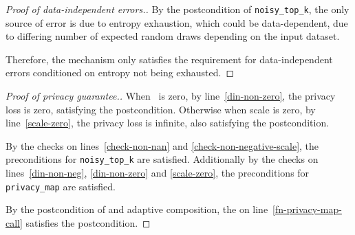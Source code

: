 \documentclass{article}
\begin{document}
\begin{theorem}
    \label{postcondition}
\end{theorem}

\begin{proof}[Proof of data-independent errors.]
    By the postcondition of \texttt{noisy\_top\_k},
    the only source of error is due to entropy exhaustion, which could be data-dependent, 
    due to differing number of expected random draws depending on the input dataset.

    Therefore, the mechanism only satisfies the requirement for data-independent errors conditioned on entropy not being exhausted.
\end{proof}

\begin{proof}[Proof of privacy guarantee.]
    When \din\ is zero, by line~\ref{din-non-zero}, the privacy loss is zero, satisfying the postcondition.
    Otherwise when scale is zero, by line~\ref{scale-zero}, the privacy loss is infinite, also satisfying the postcondition.

    By the checks on lines~\ref{check-non-nan} and \ref{check-non-negative-scale}, 
    the preconditions for \texttt{noisy\_top\_k} are satisfied.
    Additionally by the checks on lines~\ref{din-non-neg}, \ref{din-non-zero} and \ref{scale-zero}, 
    the preconditions for \texttt{privacy\_map} are satisfied.

    By the postcondition of  and adaptive composition,
    the \dout on line~\ref{fn-privacy-map-call} satisfies the postcondition.
\end{proof}
\end{document}
